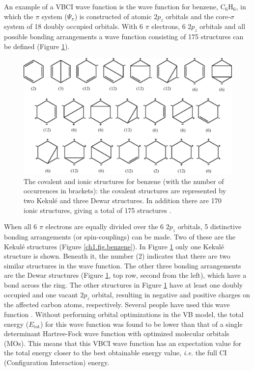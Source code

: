 An example of a VBCI wave function is the wave function for benzene, C$_6$H$_6$, in which the $\pi$ system ($\Psi_{\pi}$) is constructed of atomic $2p_z$ orbitals and the core-$\sigma$ system of 18 doubly occupied orbitals. With 6 $\pi$ electrons, 6 $2p_z$ orbitals and all possible bonding arrangements a wave function consisting of 175 structures can be defined (Figure \ref{ch1.fig.structures2}). 
\begin{figure}[htbp]
\center
\includegraphics[scale=0.9]{introduction/figures/allstructures.eps}
\caption{The covalent and ionic structures for benzene (with the number of occurrences in brackets): the covalent structures are represented by two Kekul\'e and three Dewar structures. In addition there are 170 ionic structures, giving a total of 175 structures \cite{chembrit}.}
\label{ch1.fig.structures2}
\end{figure}
When all 6 $\pi$ electrons are equally divided over the 6 $2p_z$ orbitals, 5 distinctive bonding arrangements (or spin-couplings) can be made. Two of these are the Kekul\'e structures (Figure \ref{ch1.fig.benzene}). In Figure \ref{ch1.fig.structures2} only one Kekul\'e structure is shown. Beneath it, the number (2) indicates that there are two similar structures in the wave function. The other three bonding arrangements are the Dewar structures (Figure \ref{ch1.fig.structures2}, top row, second from the left), which have a bond across the ring. The other structures in Figure \ref{ch1.fig.structures2} have at least one doubly occupied and one vacant $2p_z$ orbital, resulting in negative and positive charges on the affected carbon atoms, respectively. Several people have used this wave function \cite{vbci175_1,vbci175_2}. Without performing orbital optimizations in the VB model, the total energy ($E_\mathrm{tot}$) for this wave function was found to be lower than that of a single determinant Hartree-Fock wave function with optimized molecular orbitals (MOs). This means that this VBCI wave function has an expectation value for the total energy closer to the best obtainable energy value, \textit{i.e.} the full CI (Configuration Interaction) energy. 

